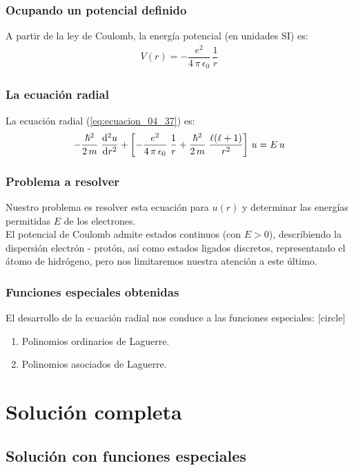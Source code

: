 \documentclass[12pt]{beamer}
\begin{document}
\begin{frame}
\frametitle{Ocupando un potencial definido}
A partir de la ley de Coulomb, la energía potencial (en unidades SI) es:
\begin{align}
    V(r) = - \dfrac{e^{2}}{4 \, \pi \, \epsilon_{0}} \, \dfrac{1}{r}
\end{align}
\end{frame}
\begin{frame}
\frametitle{La ecuación radial}
La ecuación radial (\ref{eq:ecuacion_04_37}) es:
\begin{align}
    - \dfrac{\hbar^{2}}{2 \, m} \; \dv[2]{u}{r} + \left[ - \dfrac{e^{2}}{4 \, \pi \, \epsilon_{0}} \; \dfrac{1}{r} + \dfrac{\hbar^{2}}{2 \, m} \; \dfrac{\ell(\ell +1)}{r^{2}} \right] \, u =  E \, u
    \label{eq:ecuacion_04_53}
\end{align}
\end{frame}
\begin{frame}
\frametitle{Problema a resolver}
Nuestro problema es resolver esta ecuación para $u(r)$ y determinar las energías permitidas $E$ de los electrones. 
\\
\bigskip
\pause
El potencial de Coulomb admite estados continuos (con $E > 0$), describiendo la dispersión  electrón - protón, así como estados ligados discretos, representando el átomo de hidrógeno, pero nos limitaremos nuestra atención a este último.
\end{frame}
\begin{frame}
\frametitle{Funciones especiales obtenidas}
El desarrollo de la ecuación radial nos conduce a las funciones especiales:
[circle]
\begin{enumerate}[<+->]
\item Polinomios ordinarios de Laguerre.
\item Polinomios asociados de Laguerre.
\end{enumerate}
\end{frame}

\section{Solución completa}
\subsection{Solución con funciones especiales}
\end{document}
